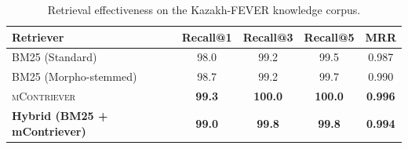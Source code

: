 \begin{table}[ht]
\centering
\small
\caption{Retrieval effectiveness on the Kazakh-FEVER knowledge corpus.}
\label{tab:retrieval_results}
\begin{tabular}{lcccc}
\toprule
\textbf{Retriever} & \textbf{Recall@1} & \textbf{Recall@3} & \textbf{Recall@5} & \textbf{MRR} \\
\midrule
BM25 (Standard) & 98.0 & 99.2 & 99.5 & 0.987 \\
BM25 (Morpho-stemmed) & 98.7 & 99.2 & 99.7 & 0.990 \\
\textsc{mContriever} & \textbf{99.3} & \textbf{100.0} & \textbf{100.0} & \textbf{0.996} \\
\textbf{Hybrid (BM25 + mContriever)} & \textbf{99.0} & \textbf{99.8} & \textbf{99.8} & \textbf{0.994} \\
\bottomrule
\end{tabular}
\end{table}
